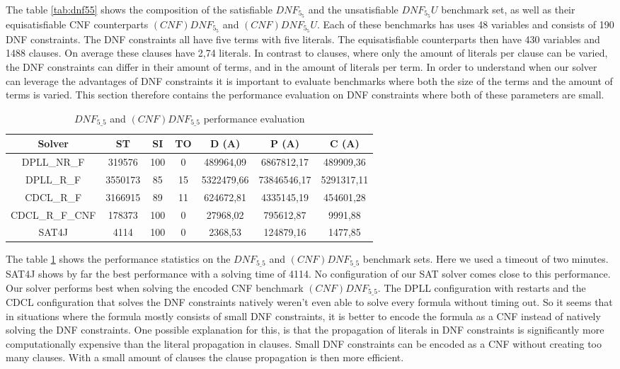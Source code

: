 The table \ref{tab:dnf55} shows the composition of the satisfiable $DNF_{5_5}$ and the unsatisfiable $DNF_{5_5}U$ benchmark set, as well as their equisatisfiable CNF counterparts $(CNF)DNF_{5_5}$ and $(CNF)DNF_{5_5}U$. Each of these benchmarks has uses 48 variables and consists of 190 DNF constraints. The DNF constraints all have five terms with five literals. The equisatisfiable counterparts then have 430 variables and 1488 clauses. On average these clauses have 2,74 literals. In contrast to clauses, where only the amount of literals per clause can be varied, the DNF constraints can differ in their amount of terms, and in the amount of literals per term. In order to understand when our solver can leverage the advantages of DNF constraints it is important to evaluate benchmarks where both the size of the terms and the amount of terms is varied. This section therefore contains the performance evaluation on DNF constraints where both of these parameters are small.



\begin{table}[!htb]
\centering
\caption{$DNF_{5\_5}$ and $(CNF)DNF_{5\_5}$ performance evaluation}
\label{tab:dnf55Sat}
\begin{tabular}{|c|c|c|c|c|c|c|}
\hline
Solver & ST & SI & TO & D (A) & P (A) & C (A)\\
\hline
DPLL\_NR\_F & 319576 & 100 & 0 & 489964,09 & 6867812,17 & 489909,36 \\
\hline
DPLL\_R\_F & 3550173 & 85 & 15 & 5322479,66 & 73846546,17 & 5291317,11 \\
\hline
CDCL\_R\_F & 3166915 & 89 & 11 & 624672,81 & 4335145,19 & 454601,28 \\
\hline
CDCL\_R\_F\_CNF & 178373 & 100 & 0 & 27968,02 & 795612,87 & 9991,88 \\
\hline
SAT4J & 4114 & 100 & 0 & 2368,53 & 124879,16 & 1477,85 \\
\hline
\end{tabular}
\end{table}

The table \ref{tab:dnf55Sat} shows the performance statistics on the $DNF_{5\_5}$ and $(CNF)DNF_{5\_5}$ benchmark sets. Here we used a timeout of two minutes. SAT4J shows by far the best performance with a solving time of 4114. No configuration of our SAT solver comes close to this performance. Our solver performs best when solving the encoded CNF benchmark $(CNF)DNF_{5\_5}$. The DPLL configuration with restarts and the CDCL configuration that solves the DNF constraints natively weren't even able to solve every formula without timing out. So it seems that in situations where the formula mostly consists of small DNF constraints, it is better to encode the formula as a CNF instead of natively solving the DNF constraints. One possible explanation for this, is that the propagation of literals in DNF constraints is significantly more computationally expensive than the literal propagation in clauses. Small DNF constraints can be encoded as a CNF without creating too many clauses. With a small amount of clauses the clause propagation is then more efficient.

